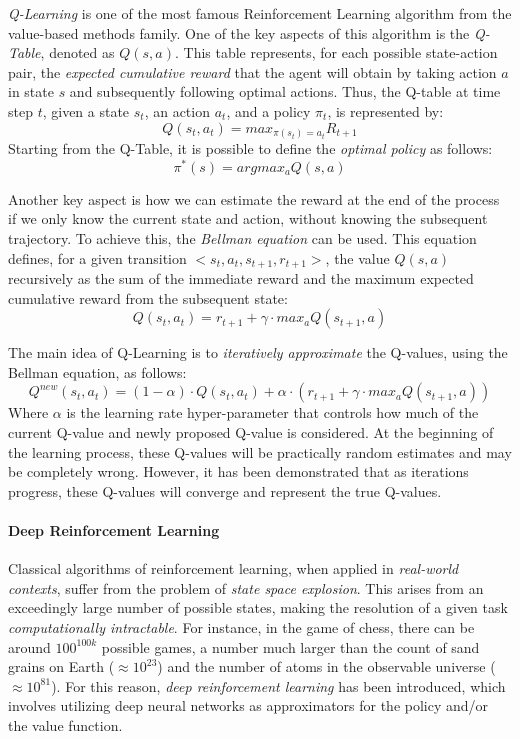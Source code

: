\documentclass[12pt,a4paper,openright,twoside]{book}
\begin{document}
\emph{Q-Learning} is one of the most famous Reinforcement Learning algorithm from the value-based methods family. 
    One of the key aspects of this algorithm is the \emph{Q-Table}, denoted as $Q(s,a)$. This table represents, 
    for each possible state-action pair, the \emph{expected cumulative reward} that the agent will obtain by
    taking action $a$ in state $s$ and subsequently following optimal actions. 
    Thus, the Q-table at time step $t$, given a state $s_t$, an action $a_t$, and a policy $\pi_t$, is represented by:
    $$ Q(s_t, a_t) = max_{\pi(s_t) = a_t} R_{t+1}$$
    Starting from the Q-Table, it is possible to define the \emph{optimal policy} as follows:
    $$ \pi^{*}(s) = argmax_a Q(s,a) $$

Another key aspect is how we can estimate the reward at the end of the process if we only know the current state 
    and action, without knowing the subsequent trajectory. To achieve this, the \emph{Bellman equation} can be used. 
    This equation defines, for a given transition $<s_t, a_t, s_{t+1}, r_{t+1}>$, the value $Q(s,a)$ recursively 
    as the sum of the immediate reward and the maximum expected cumulative reward from the subsequent state:
    $$ Q(s_t,a_t) =  r_{t+1} + \gamma \cdot max_a Q(s_{t+1}, a)$$

The main idea of Q-Learning is to \emph{iteratively approximate} the Q-values, using the Bellman equation, as follows:
$$ Q^{new}(s_t,a_t) = (1-\alpha) \cdot Q(s_t,a_t) + \alpha \cdot (r_{t+1} + \gamma \cdot max_a Q(s_{t+1}, a)) $$
    Where $\alpha$ is the learning rate hyper-parameter that controls how much of the current Q-value and newly proposed
    Q-value is considered.
    At the beginning of the learning process, these Q-values will be practically random estimates and may be completely wrong. 
    However, it has been demonstrated that as iterations progress, these Q-values will 
    converge and represent the true Q-values.

\paragraph{Deep Reinforcement Learning}

Classical algorithms of reinforcement learning, when applied in \emph{real-world contexts}, suffer from the problem of \emph{state space explosion}.
    This arises from an exceedingly large number of possible states, making the resolution of a given task \emph{computationally intractable}. 
    For instance, in the game of chess, there can be around $100^{100k}$ possible games, a number much larger than 
    the count of sand grains on Earth ($\approx 10^{23}$) and the number of atoms in the observable universe 
    ($\approx 10^{81}$). 
    For this reason, \emph{deep reinforcement learning} has been introduced, which involves utilizing deep neural networks
    as approximators for the policy and/or the value function.
\end{document}
